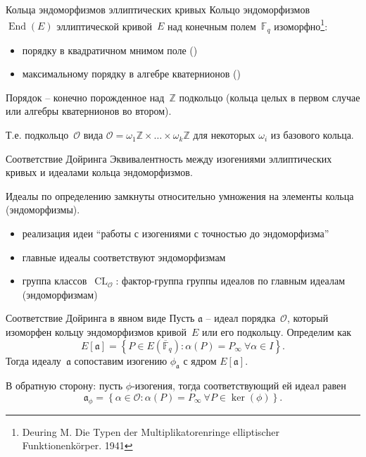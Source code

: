 \documentclass{beamer}
\begin{document}
\begin{frame}{Кольца эндоморфизмов эллиптических кривых}
Кольцо эндоморфизмов~$\operatorname{End}(E)$ эллиптической кривой~$E$ над конечным полем~$\mathbb{F}_q$ изоморфно\footnote{\scriptsize Deuring M. Die Typen der Multiplikatorenringe elliptischer Funktionenkörper. 1941}:
\begin{itemize}
	\item порядку в квадратичном мнимом поле ()
	\item максимальному порядку в алгебре кватернионов ()
\end{itemize}

\vspace{0.5em}
Порядок -- конечно порожденное над~$\mathbb{Z}$ подкольцо (кольца целых в первом случае или алгебры кватернионов во втором).

\vspace{0.5em}
Т.е. подкольцо~$\mathcal{O}$ вида $\mathcal{O} = \omega_1 \mathbb{Z} \times \ldots \times \omega_k \mathbb{Z}$ для некоторых $\omega_i$ из базового кольца.
\end{frame}

\begin{frame}{Соответствие Дойринга}
Эквивалентность между изогениями эллиптических кривых и идеалами кольца эндоморфизмов.

\vspace{0.5em}

Идеалы по определению замкнуты относительно умножения на элементы кольца (эндоморфизмы).
\begin{itemize}
	\item реализация идеи ``работы с изогениями с точностью до эндоморфизма''
	\item главные идеалы соответствуют эндоморфизмам
	\item группа классов~$\operatorname{CL}_\mathcal{O}$: фактор-группа группы идеалов по главным идеалам (эндоморфизмам) 
\end{itemize}
\end{frame}

\begin{frame}{Соответствие Дойринга в явном виде}
Пусть $\mathfrak{a}$ -- идеал порядка~$\mathcal{O}$, который изоморфен кольцу эндоморфизмов кривой~$E$ или его подкольцу. Определим  как
\[
E[\mathfrak{a}] = \left\{P \in E(\overline{\mathbb{F}}_q): \alpha(P) = P_\infty~\forall \alpha \in I \right\}.
\]
Тогда идеалу~$\mathfrak{a}$ сопоставим изогению  $\phi_\mathfrak{a}$ с ядром $E[\mathfrak{a}]$.
\vspace{0.5em}

В обратную сторону: пусть $\phi$-изогения, тогда соответствующий ей идеал равен
\[
\mathfrak{a}_\phi = \left\{ \alpha \in \mathcal{O}: \alpha(P) = P_\infty ~\forall P \in \ker(\phi) \right\}.
\]
\end{frame}
\end{document}
